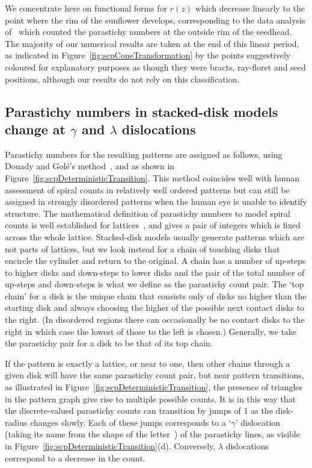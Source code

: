 \documentclass[a4paper,10pt]{amsart}
\begin{document}
We concentrate here on functional forms for $r(z)$ which decrease linearly to the point where the rim of the sunflower develops, corresponding to the data analysis of~\cite{swintonNovelFibonacciNonFibonacci2016} which counted the parastichy numbers at the outside rim of the seedhead. The majority of our numerical results are taken at the end of this linear  period, as indicated in Figure~\ref{fig:scpConeTransformation} by the points suggestively coloured for explanatory purposes as though they were bracts, ray-floret and seed positions, although our results do not rely on this classification. 



\subsection{Parastichy numbers in stacked-disk models change at $\gamma$ and $\lambda$ dislocations}
 Parastichy numbers for the resulting patterns are assigned as follows, using Douady and Gol\'e's method~\cite{goleFibonacciQuasisymmetricPhyllotaxis2016}, and as shown in Figure~\ref{fig:scpDeterministicTransition}. This method coincides well with human assessment of spiral counts in relatively well ordered patterns but can still be assigned in strongly disordered patterns when the human eye is unable to identify structure. 
%
The mathematical definition of parastichy numbers to model spiral counts is well established for lattices~\cite{swintonMathematicalPhyllotaxis2023}, and gives a pair of integers which is fixed across the whole lattice. Stacked-disk models usually generate patterns which are not parts of lattices, but we look instead for a chain of touching disks that encircle the cylinder and return to the original.   A chain has a number of up-steps to higher disks and down-steps to lower disks and the pair of the total number of up-steps and down-steps is what we define as the parastichy count pair. The `top chain' for a disk is the unique chain that consists only of disks no higher than the starting disk and always choosing the higher of the possible next contact disks to the right. (In disordered regions there can occasionally be no contact disks to the right in which case the lowest of those to the left is chosen.)  Generally, we take the parastichy pair for a disk to be that of its top chain. 

If the pattern is exactly a lattice, or near to one,
then other chains  through a given disk will have the same parastichy count pair, but near pattern transitions, as illustrated in Figure~\ref{fig:scpDeterministicTransition}, the presence of triangles in the pattern graph give rise to  multiple possible  counts. It is in this way that the discrete-valued parastichy counts can transition by jumps of 1 as the disk-radius changes slowly. 
Each of these jumps corresponds to a `$\gamma$' dislocation (taking its name from the shape of the letter~\cite{zagorska-marekPhyllotacticPatternsTransitions1985}) of the parastichy lines,  as visible in Figure~\ref{fig:scpDeterministicTransition}(d). 
Conversely, $\lambda$ dislocations correspond to a decrease in the count.
\end{document}
